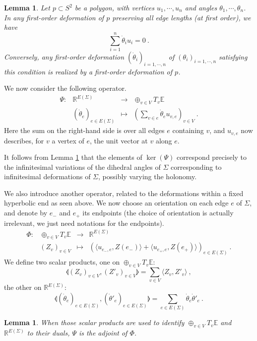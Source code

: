 \documentclass[notitlepage,twoside,a4paper]{amsart}
\newtheorem{lemma}[theorem]{\rm\bf Lemma}
\theoremstyle{named}
\newcommand{\R}{{\mathbb R}}
\newcommand{\bE}{{\mathbb E}}
\begin{document}
\begin{lemma} \label{lm:polygons}
  Let $p\subset S^2$ be a polygon, with vertices $u_1, \cdots, u_n$ and angles $\theta_1, \cdots, \theta_n$. In any first-order deformation of $p$ preserving all edge lengths (at first order), we have
  $$ \sum_{i=1}^n \dot\theta_i u_i=0~. $$
  Conversely, any first-order deformation $(\dot\theta_i)_{i=1, \cdots, n}$ of $(\theta_i)_{i=1, \cdots, n}$ satisfying this condition is realized by a first-order deformation of $p$.
\end{lemma}

We now consider the following operator.
$$
\begin{array}{rccc}
  \Psi: & \R^{E(\Sigma)} & \to & \oplus_{v\in V}T_v\bE \\
  & (\dot \theta_e)_{e\in E(\Sigma)} & \mapsto & \left(\sum_{v\in e}\dot \theta_eu_{v,e}\right)_{v\in V}~. 
\end{array}
$$
Here the sum on the right-hand side is over all edges $e$ containing $v$, and $u_{v,e}$ now describes, for $v$ a vertex of $e$, the unit vector at $v$ along $e$.

It follows from Lemma \ref{lm:polygons} that the elements of $\ker(\Psi)$ correspond precisely to the infinitesimal variations of the dihedral angles of $\Sigma$ corresponding to infinitesimal deformations of $\Sigma$, possibly varying the holonomy.

We also introduce another operator, related to the deformations within a fixed hyperbolic end as seen above. We now choose an orientation on each edge $e$ of $\Sigma$, and denote by $e_-$ and $e_+$ its endpoints (the choice of orientation is actually irrelevant, we just need notations for the endpoints).
$$
\begin{array}{rccc}
  \Phi: & \oplus_{v\in V}T_v\bE & \to &  \R^{E(\Sigma)} \\
  & (Z_v)_{v\in V}& \mapsto & (\langle u_{e_-,e}, Z(e_-)\rangle+\langle u_{e_+,e}, Z(e_+)\rangle)_{e\in E(\Sigma)}~. 
\end{array}
$$
We define two scalar products, one on $\oplus_{v\in V}T_v\bE$:
$$ \llangle (Z_v)_{v\in V},(Z'_v)_{v\in V}\rrangle = \sum_{v\in V} \langle Z_v, Z'_v\rangle~, $$
the other on $\R^{E(\Sigma)}$:
$$ \llangle (\dot \theta_e)_{e\in E(\Sigma)}, (\dot \theta'_e)_{e\in E(\Sigma)}\rrangle = \sum_{e\in E(\Sigma)} \dot \theta_e\dot \theta'_e~. $$

\begin{lemma}
  When those scalar products are used to identify $\oplus_{v\in V}T_v\bE$ and $\R^{E(\Sigma)}$ to their duals, $\Psi$ is the adjoint of $\Phi$.  
\end{lemma}
\end{document}
